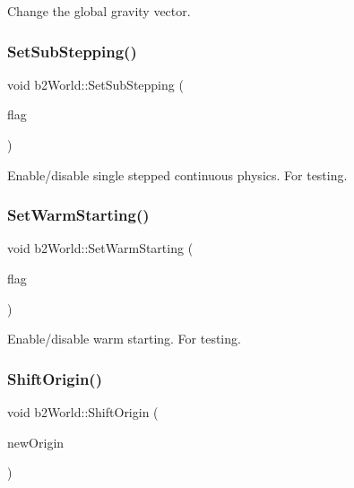 Change the global gravity vector. 

\mbox{\label{classb2_world_ae8aacc78ea4753075067daff51b61778}} 
\subsubsection{\texorpdfstring{SetSubStepping()}{SetSubStepping()}}
{\footnotesize\ttfamily void b2\+World\+::\+Set\+Sub\+Stepping (\begin{DoxyParamCaption}\item[{bool}]{flag }\end{DoxyParamCaption})\hspace{0.3cm}{\ttfamily [inline]}}



Enable/disable single stepped continuous physics. For testing. 

\mbox{\label{classb2_world_a8e8c12142e8c4884a18787926a261359}} 
\subsubsection{\texorpdfstring{SetWarmStarting()}{SetWarmStarting()}}
{\footnotesize\ttfamily void b2\+World\+::\+Set\+Warm\+Starting (\begin{DoxyParamCaption}\item[{bool}]{flag }\end{DoxyParamCaption})\hspace{0.3cm}{\ttfamily [inline]}}



Enable/disable warm starting. For testing. 

\mbox{\label{classb2_world_afc33e20e64252c5be115216051408047}} 
\subsubsection{\texorpdfstring{ShiftOrigin()}{ShiftOrigin()}}
{\footnotesize\ttfamily void b2\+World\+::\+Shift\+Origin (\begin{DoxyParamCaption}\item[{const \mbox{\hyperlink{structb2_vec2}{b2\+Vec2}} \&}]{new\+Origin }\end{DoxyParamCaption})}

